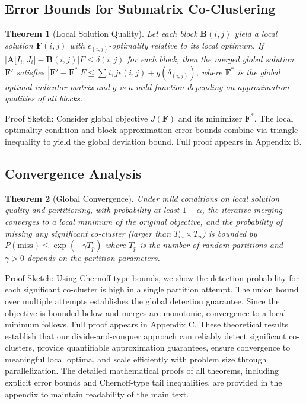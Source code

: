 \documentclass[journal]{IEEEtran}
\newtheorem{theorem}{Theorem}
\begin{document}
\subsection{Error Bounds for Submatrix Co-Clustering}
\begin{theorem}[Local Solution Quality]
    Let each block $\mathbf{B}{(i,j)}$ yield a local solution $\mathbf{F}{(i,j)}$ with $\epsilon_{(i,j)}$-optimality relative to its local optimum. If $|\mathbf{A}\lbrack I_i,J_i\rbrack - \mathbf{B}{(i,j)}|F \le \delta{(i,j)}$ for each block, then the merged global solution $\mathbf{F}'$ satisfies $|\mathbf{F}' - \mathbf{F}^*|F \le \sum{i,j} \epsilon{(i,j)} + g({\delta_{(i,j)}})$, where $\mathbf{F}^*$ is the global optimal indicator matrix and $g$ is a mild function depending on approximation qualities of all blocks.
\end{theorem}
Proof Sketch: Consider global objective $J(\mathbf{F})$ and its minimizer $\mathbf{F}^*$. The local optimality condition and block approximation error bounds combine via triangle inequality to yield the global deviation bound. Full proof appears in Appendix B.

\subsection{Convergence Analysis}
\begin{theorem}[Global Convergence]
    Under mild conditions on local solution quality and partitioning, with probability at least $1-\alpha$, the iterative merging converges to a local minimum of the original objective, and the probability of missing any significant co-cluster (larger than $T_m \times T_n$) is bounded by $P(\text{miss}) \le \exp(-\gamma T_p)$ where $T_p$ is the number of random partitions and $\gamma > 0$ depends on the partition parameters.
\end{theorem}
Proof Sketch: Using Chernoff-type bounds, we show the detection probability for each significant co-cluster is high in a single partition attempt. The union bound over multiple attempts establishes the global detection guarantee. Since the objective is bounded below and merges are monotonic, convergence to a local minimum follows. Full proof appears in Appendix C.
These theoretical results establish that our divide-and-conquer approach can reliably detect significant co-clusters, provide quantifiable approximation guarantees, ensure convergence to meaningful local optima, and scale efficiently with problem size through parallelization. The detailed mathematical proofs of all theorems, including explicit error bounds and Chernoff-type tail inequalities, are provided in the appendix to maintain readability of the main text.
\end{document}
